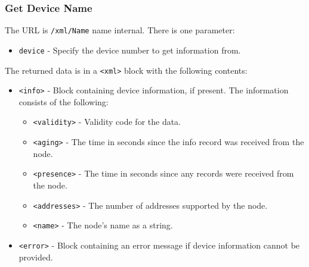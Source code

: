 \documentclass[10pt, openany, draft]{article}
\begin{document}
\subsubsection{Get Device Name}
The URL is \texttt{/xml/Name} name internal.  There is one parameter:
\begin{itemize}
  \item \texttt{device} - Specify the device number to get information from.
\end{itemize}

The returned data is in a \texttt{<xml>} block with the following contents:
\begin{itemize}
  \item \texttt{<info>} - Block containing device information, if present.  The information consists of the following:
  \begin{itemize}
    \item \texttt{<validity>} - Validity code for the data.
    \item \texttt{<aging>} - The time in seconds since the info record was received from the node.
    \item \texttt{<presence>} - The time in seconds since any records were received from the node.
    \item \texttt{<addresses>} - The number of addresses supported by the node.
    \item \texttt{<name>} - The node's name as a string.
  \end{itemize}
  \item \texttt{<error>} - Block containing an error message if device information cannot be provided.
\end{itemize}
\end{document}
